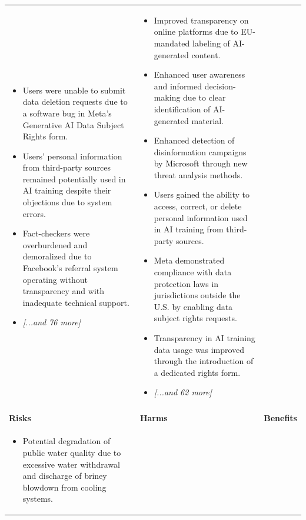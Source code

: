 \begin{longtable}{p{5.2cm}|p{5.2cm}|p{5.2cm}}
\begin{itemize}[leftmargin=*, nosep, before=\vspace{-0.5\baselineskip}, after=\vspace{-0.5\baselineskip}]
\item Users were unable to submit data deletion requests due to a software bug in Meta's Generative AI Data Subject Rights form.
\item Users' personal information from third-party sources remained potentially used in AI training despite their objections due to system errors.
\item Fact-checkers were overburdened and demoralized due to Facebook's referral system operating without transparency and with inadequate technical support.
\item \textit{[...and 76 more]}
\end{itemize} & \begin{itemize}[leftmargin=*, nosep, before=\vspace{-0.5\baselineskip}, after=\vspace{-0.5\baselineskip}] 
\footnotesize
\item Improved transparency on online platforms due to EU-mandated labeling of AI-generated content.
\item Enhanced user awareness and informed decision-making due to clear identification of AI-generated material.
\item Enhanced detection of disinformation campaigns by Microsoft through new threat analysis methods.
\item Users gained the ability to access, correct, or delete personal information used in AI training from third-party sources.
\item Meta demonstrated compliance with data protection laws in jurisdictions outside the U.S. by enabling data subject rights requests.
\item Transparency in AI training data usage was improved through the introduction of a dedicated rights form.
\item \textit{[...and 62 more]}
\end{itemize} \\
\pagebreak
\multicolumn{3}{l}{\textbf{\large Energy} \textit{(N=32 articles)}} \\
\midrule
\textbf{Risks} & \textbf{Harms} & \textbf{Benefits} \\
\midrule
\begin{itemize}[leftmargin=*, nosep, before=\vspace{-0.5\baselineskip}, after=\vspace{-0.5\baselineskip}] 
\footnotesize
\item Potential degradation of public water quality due to excessive water withdrawal and discharge of briney blowdown from cooling systems.

\end{itemize}
\end{longtable}
